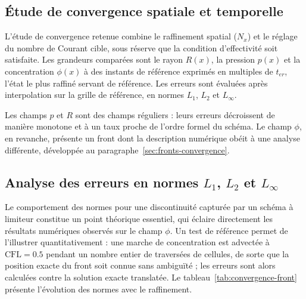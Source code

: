 \documentclass[11pt,a4paper]{report}
\newcommand{\ter}{{t_{er}}}
\begin{document}
\subsection{Étude de convergence spatiale et temporelle}

L'étude de convergence retenue combine le raffinement spatial (\(N_x\)) et le réglage du nombre de Courant
cible, sous réserve que la condition d'effectivité soit satisfaite. Les grandeurs comparées sont le
rayon \(R(x)\), la pression \(p(x)\) et la concentration \(\phi(x)\) à des instants de référence exprimés en
multiples de \(\ter\), l'état le plus raffiné servant de référence. Les erreurs sont évaluées après
interpolation sur la grille de référence, en normes \(L_1\), \(L_2\) et \(L_\infty\).

Les champs \(p\) et \(R\) sont des champs réguliers : leurs erreurs décroissent de manière monotone et à un
taux proche de l'ordre formel du schéma. Le champ \(\phi\), en revanche, présente un front dont la
description numérique obéit à une analyse différente, développée au paragraphe~\ref{sec:fronts-convergence}.

\subsection{Analyse des erreurs en normes \(L_1\), \(L_2\) et \(L_\infty\)}

Le comportement des normes pour une discontinuité capturée par un schéma à limiteur constitue un point
théorique essentiel, qui éclaire directement les résultats numériques observés sur le champ \(\phi\). Un
test de référence permet de l'illustrer quantitativement : une marche de concentration est advectée à
\(\mathrm{CFL} = 0.5\) pendant un nombre entier de traversées de cellules, de sorte que la position exacte
du front soit connue sans ambiguïté ; les erreurs sont alors calculées contre la solution exacte
translatée. Le tableau~\ref{tab:convergence-front} présente l'évolution des normes avec le raffinement.
\end{document}
